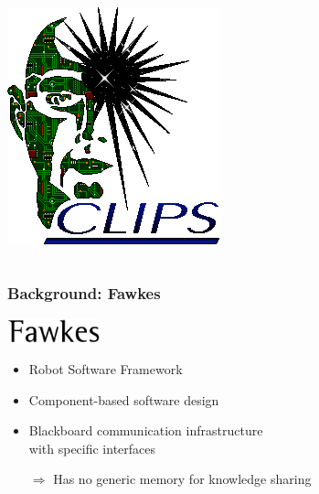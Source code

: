 \begin{frame}
\begin{columns}
\begin{column}{0.17\linewidth}
  \includegraphics[width=\textwidth]{../img/CLIPS}
  \vspace{3.4cm}
  \end{column}
  \end{columns}
\end{frame}

\begin{frame}
  \frametitle{Background: Fawkes}
  \includegraphics[width=0.2\textwidth]{../img/fawkes}  
  \begin{itemize}
    \item Robot Software Framework
    \item Component-based software design
    \item Blackboard communication infrastructure\\ with specific interfaces
    \item[$\Rightarrow$] Has no generic memory for knowledge sharing
  \end{itemize}
\end{frame}

